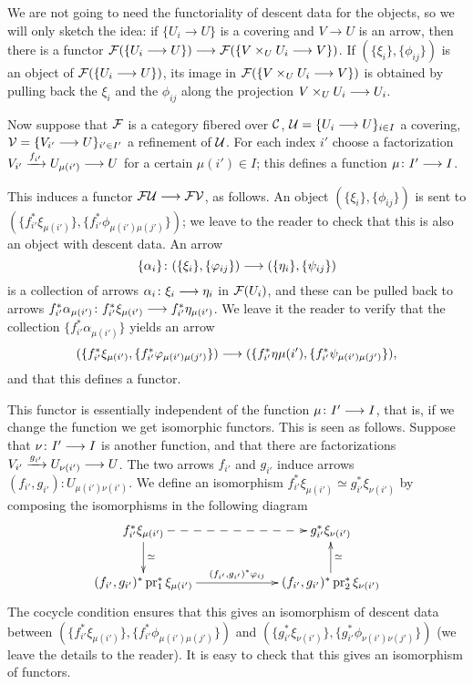 \begin{4   STACKS}
\begin{4.1 Descent of objects of fibcats}
We are not going to need the functoriality of descent data for the objects, so we will only sketch the idea: if $\{U_{i} \to U\}$ is a covering and $V \to U$ is an arrow, then there is a functor $\cF(\{U_{i}\to U\}) \arr 
\cF(\{V \times_{U} U_{i} \to V\})$. If $(\{\xi_{i}\}, \{\phi_{ij}\})$ is an object of $\mathcal{F}(\{U_{i}\longrightarrow U\})$, its image in $\mathcal{F}(\{V \times_{U} U_{i} \longrightarrow V\})$ is obtained by pulling back the $\xi_{i}$ and the $\phi_{ij}$ along the projection $V \times_{U} U_{i} \arr U_{i}$.

Now suppose that $\mathcal{F}$ is a category fibered over $\mathcal{C}$, $\mathcal{U} = \{U_{i} \longrightarrow U\}_{i \in I}$ a covering, $\mathcal{V} = \{V_{i'} \longrightarrow U\}_{i' \in I'}$ a refinement of $\mathcal{U}$. For each index $i'$ choose a factorization $V_{i'} \xrightarrow{f_{i'}} U_{\mu(i')} \arr U$ for a certain $\mu(i') \in I$; this defines a function $\mu\colon I' \arr I$.

This induces a functor $\cF\cU \arr \cF\cV$, as follows. An object $(\{\xi_{i}\}, \{\phi_{ij}\})$ is sent to $(\{f_{i'}^{*}\xi_{\mu(i')}\}, \{f_{i'}^{*}\phi_{\mu(i')\mu(j')}\})$; we leave to the reader to check that this is also an object with descent data. An arrow 
   \[
   \{\alpha_{i}\}\colon (\{\xi_{i}\}, \{\phi_{ij}\}) \arr
                        (\{\eta_{i}\}, \{\psi_{ij}\})
   \]
is a collection of arrows $\alpha_{i}\colon \xi_{i}\arr \eta_{i}$ in $\mathcal{F}(U_{i})$, and these can be pulled back to arrows $f_{i'}^{*}\alpha_{\mu(i')}\colon f_{i'}^{*}\xi_{\mu(i')} \arr f_{i'}^{*}\eta_{\mu(i')}$. We leave it the reader to verify that the collection $\{f_{i'}^{*}\alpha_{\mu(i')}\}$ yields an arrow
   \[
   (\{f_{i'}^{*}\xi_{\mu(i')}, \{f_{i'}^{*}\phi_{\mu(i')\mu(j')}\})\arr
   (\{f_{i'}^{*}\eta{\mu(i')}, \{f_{i'}^{*}\psi_{\mu(i')\mu(j')}\}),
   \]
and that this defines a functor.

This functor is essentially independent of the function $\mu\colon I' \arr I$, that is, if we change the function we get isomorphic functors. This is seen as follows. Suppose that $\nu\colon I' \arr I$ is another function, and that there are factorizations $V_{i'} \xrightarrow{g_{i'}} U_{\nu(i')} \arr U$. The two arrows $f_{i'}$ and $g_{i'}$ induce arrows $(f_{i'}, g_{i'})\colon U_{\mu(i') \nu(i')}$. We define an isomorphism $f_{i'}^{*}\xi_{\mu(i')} \simeq g_{i'}^{*}\xi_{\nu(i')}$ by composing the isomorphisms in the following diagram
   \[
   \xymatrix@C+40pt{
   f_{i'}^{*}\xi_{\mu(i')}\ar@{-->}[r]\ar[d]^{\simeq} &
      g_{i'}^{*}\xi_{\nu(i')}
      \\
   (f_{i'}, g_{i'})^{*}\pr_{1}^{*}\xi_{\mu(i')}
         \ar[r]^-{(f_{i'}, g_{i'})^{*}\phi_{ij}} & 
      (f_{i'}, g_{i'})^{*}\pr_{2}^{*}\xi_{\nu(i')} \ar[u]_{\simeq}
   }
   \]
The cocycle condition ensures that this gives an isomorphism of descent data between $(\{f_{i'}^{*}\xi_{\mu(i')}\}, \{f_{i'}^{*}\phi_{\mu(i')\mu(j')}\})$ and $(\{g_{i'}^{*}\xi_{\nu(i')}\}, \{g_{i'}^{*}\phi_{\nu(i')\nu(j')}\})$ (we leave the details to the reader). It is easy to check that this gives an isomorphism of functors.


\end{4.1 Descent of objects of fibcats}
\end{4   STACKS}
